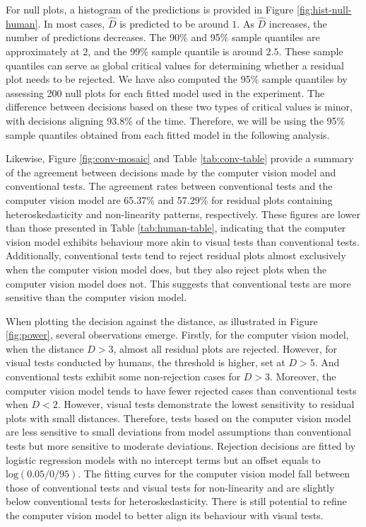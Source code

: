 \documentclass[]{interact}
\theoremstyle{plain}%
\theoremstyle{definition}
\theoremstyle{remark}
\begin{document}
For null plots, a histogram of the predictions is provided in Figure
\ref{fig:hist-null-human}. In most cases, \(\hat{D}\) is predicted to be
around \(1\). As \(\hat{D}\) increases, the number of predictions
decreases. The 90\% and 95\% sample quantiles are approximately at
\(2\), and the 99\% sample quantile is around \(2.5\). These sample
quantiles can serve as global critical values for determining whether a
residual plot needs to be rejected. We have also computed the 95\%
sample quantiles by assessing 200 null plots for each fitted model used
in the experiment. The difference between decisions based on these two
types of critical values is minor, with decisions aligning 93.8\% of the
time. Therefore, we will be using the 95\% sample quantiles obtained
from each fitted model in the following analysis.

Likewise, Figure \ref{fig:conv-mosaic} and Table \ref{tab:conv-table}
provide a summary of the agreement between decisions made by the
computer vision model and conventional tests. The agreement rates
between conventional tests and the computer vision model are 65.37\% and
57.29\% for residual plots containing heteroskedasticity and
non-linearity patterns, respectively. These figures are lower than those
presented in Table \ref{tab:human-table}, indicating that the computer
vision model exhibits behaviour more akin to visual tests than
conventional tests. Additionally, conventional tests tend to reject
residual plots almost exclusively when the computer vision model does,
but they also reject plots when the computer vision model does not. This
suggests that conventional tests are more sensitive than the computer
vision model.

When plotting the decision against the distance, as illustrated in
Figure \ref{fig:power}, several observations emerge. Firstly, for the
computer vision model, when the distance \(D > 3\), almost all residual
plots are rejected. However, for visual tests conducted by humans, the
threshold is higher, set at \(D > 5\). And conventional tests exhibit
some non-rejection cases for \(D > 3\). Moreover, the computer vision
model tends to have fewer rejected cases than conventional tests when
\(D < 2\). However, visual tests demonstrate the lowest sensitivity to
residual plots with small distances. Therefore, tests based on the
computer vision model are less sensitive to small deviations from model
assumptions than conventional tests but more sensitive to moderate
deviations. Rejection decisions are fitted by logistic regression models
with no intercept terms but an offset equals to
\(\text{log}(0.05/0/95)\). The fitting curves for the computer vision
model fall between those of conventional tests and visual tests for
non-linearity and are slightly below conventional tests for
heteroskedasticity. There is still potential to refine the computer
vision model to better align its behaviour with visual tests.
\end{document}
